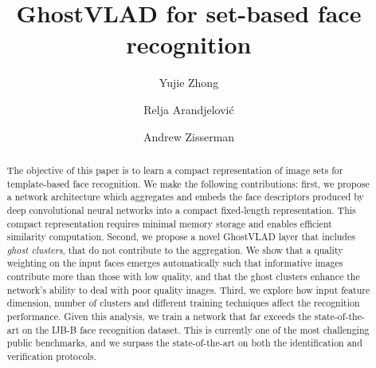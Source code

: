 \documentclass[runningheads]{llncs}
\begin{document}
%

\title{GhostVLAD for set-based face recognition} 
%

%

\author{Yujie Zhong \and
Relja Arandjelovi\'c\and
Andrew Zisserman}

%
%
%
%

%
%
%

%




\def\eg{\emph{e.g. }}
\def\Eg{\emph{E.g. }}
\def\etal{\emph{et al. }}
\def\ie{\emph{i.e. }}
\def\etc{\emph{etc. }}

\renewcommand{\paragraph}[1]{\medskip\noindent{\emph{#1}}}

\maketitle

%
\begin{abstract}

The objective of this paper is to learn a 
compact representation of image sets for
template-based  face recognition.
We make the following 
contributions:
first, we propose a network architecture which 
aggregates and  embeds the face descriptors 
produced by deep convolutional neural networks 
into a compact fixed-length representation.
This compact representation requires minimal memory 
storage and enables  efficient similarity 
computation. 
Second, we propose a novel 
GhostVLAD layer that includes {\em ghost clusters}, that do not contribute to the aggregation.
We show that a quality
weighting on the input faces  emerges automatically
such that informative images 
contribute more than those with low  quality, and 
that  the ghost clusters enhance  the network's  ability to 
deal with poor quality images. 
Third, we explore how input feature dimension,
number of clusters and 
different training techniques affect the recognition
performance. Given this analysis, we train
a network that far exceeds the state-of-the-art
on the IJB-B face recognition dataset. This  is
currently one of the most challenging public benchmarks, and we surpass the state-of-the-art on both
the identification and verification protocols.



\end{abstract}
\end{document}
